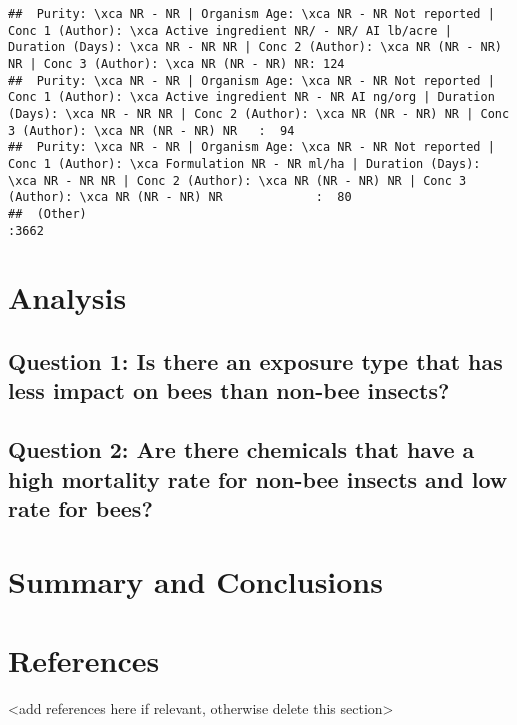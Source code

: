 \documentclass[
  12pt,
]{article}
\begin{document}
\begin{verbatim}
##  Purity: \xca NR - NR | Organism Age: \xca NR - NR Not reported | Conc 1 (Author): \xca Active ingredient NR/ - NR/ AI lb/acre | Duration (Days): \xca NR - NR NR | Conc 2 (Author): \xca NR (NR - NR) NR | Conc 3 (Author): \xca NR (NR - NR) NR: 124  
##  Purity: \xca NR - NR | Organism Age: \xca NR - NR Not reported | Conc 1 (Author): \xca Active ingredient NR - NR AI ng/org | Duration (Days): \xca NR - NR NR | Conc 2 (Author): \xca NR (NR - NR) NR | Conc 3 (Author): \xca NR (NR - NR) NR   :  94  
##  Purity: \xca NR - NR | Organism Age: \xca NR - NR Not reported | Conc 1 (Author): \xca Formulation NR - NR ml/ha | Duration (Days): \xca NR - NR NR | Conc 2 (Author): \xca NR (NR - NR) NR | Conc 3 (Author): \xca NR (NR - NR) NR             :  80  
##  (Other)                                                                                                                                                                                                                                         :3662
\end{verbatim}

\newpage

\hypertarget{analysis}{%
\section{Analysis}\label{analysis}}

\hypertarget{question-1-is-there-an-exposure-type-that-has-less-impact-on-bees-than-non-bee-insects}{%
\subsection{Question 1: Is there an exposure type that has less impact
on bees than non-bee
insects?}\label{question-1-is-there-an-exposure-type-that-has-less-impact-on-bees-than-non-bee-insects}}

\hypertarget{question-2-are-there-chemicals-that-have-a-high-mortality-rate-for-non-bee-insects-and-low-rate-for-bees}{%
\subsection{Question 2: Are there chemicals that have a high mortality
rate for non-bee insects and low rate for
bees?}\label{question-2-are-there-chemicals-that-have-a-high-mortality-rate-for-non-bee-insects-and-low-rate-for-bees}}

\newpage

\hypertarget{summary-and-conclusions}{%
\section{Summary and Conclusions}\label{summary-and-conclusions}}

\newpage

\hypertarget{references}{%
\section{References}\label{references}}

\textless add references here if relevant, otherwise delete this
section\textgreater{}
\end{document}
